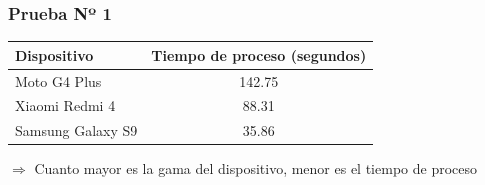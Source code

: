 \begin{frame}[t,fragile]
\frametitle {Prueba Nº 1}
\vspace{10mm}
\begin{table}[t]
	\begin{center}
		\label{tab:tiempo1}
		\begin{adjustbox}{max width=\textwidth}
			\begin{tabular}{l|c}
				\hline
				\hline
				\textbf{Dispositivo} & \textbf{Tiempo de proceso (segundos)}\\
				\hline
				Moto G4 Plus & 142.75\\
				
				Xiaomi Redmi 4 & 88.31\\
				
				Samsung Galaxy S9 & 35.86\\
				\hline
			\end{tabular}
		\end{adjustbox}
	\end{center}
\end{table}
\vspace{5mm}
\begin{center}
	$\Rightarrow$ Cuanto mayor es la gama del dispositivo, menor es el tiempo de proceso
\end{center}
\end{frame}
